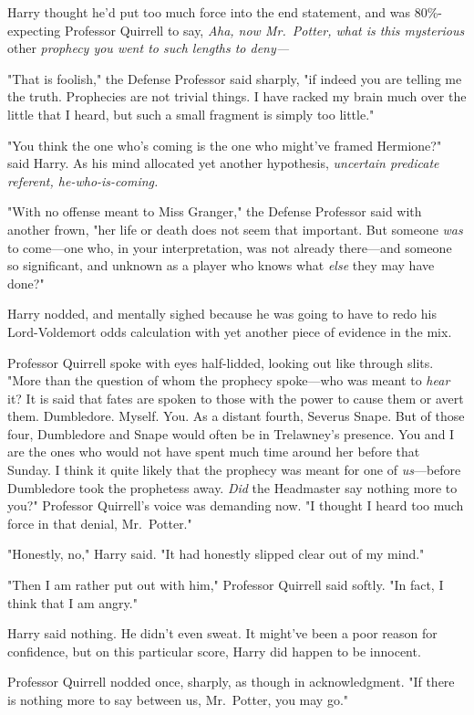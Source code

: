 Harry thought he'd put too much force into the end statement, and was
80\%-expecting Professor Quirrell to say, \emph{Aha, now Mr.~Potter, what is
this mysterious} other \emph{prophecy you went to such lengths to deny—}

"That is foolish," the Defense Professor said sharply, "if indeed you are
telling me the truth. Prophecies are not trivial things. I have racked my brain
much over the little that I heard, but such a small fragment is simply too
little."

"You think the one who's coming is the one who might've framed Hermione?" said
Harry. As his mind allocated yet another hypothesis, \emph{uncertain predicate
referent, he-who-is-coming.}

"With no offense meant to Miss Granger," the Defense Professor said with
another frown, "her life or death does not seem that important. But someone
\emph{was} to come—one who, in your interpretation, was not already
there—and someone so significant, and unknown as a player{\el} who knows
what \emph{else} they may have done?"

Harry nodded, and mentally sighed because he was going to have to redo his
Lord-Voldemort odds calculation with yet another piece of evidence in the mix.

Professor Quirrell spoke with eyes half-lidded, looking out like through slits.
"More than the question of whom the prophecy spoke—who was meant to
\emph{hear} it? It is said that fates are spoken to those with the power to
cause them or avert them. Dumbledore. Myself. You. As a distant fourth, Severus
Snape. But of those four, Dumbledore and Snape would often be in Trelawney's
presence. You and I are the ones who would not have spent much time around her
before that Sunday. I think it quite likely that the prophecy was meant for one
of \emph{us}—before Dumbledore took the prophetess away. \emph{Did} the
Headmaster say nothing more to you?" Professor Quirrell's voice was demanding
now. "I thought I heard too much force in that denial, Mr.~Potter."

"Honestly, no," Harry said. "It had honestly slipped clear out of my mind."

"Then I am rather put out with him," Professor Quirrell said softly. "In fact,
I think that I am angry."

Harry said nothing. He didn't even sweat. It might've been a poor reason for
confidence, but on this particular score, Harry did happen to be innocent.

Professor Quirrell nodded once, sharply, as though in acknowledgment. "If there
is nothing more to say between us, Mr.~Potter, you may go."

